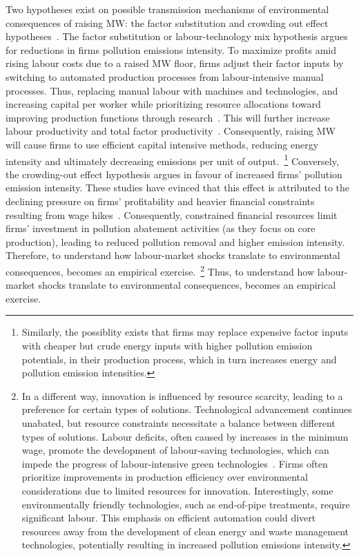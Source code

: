 \documentclass[authoryear, preprint, twocolumn, 1p]{elsarticle}
\begin{document}
    Two hypotheses exist on possible transmission mechanisms of environmental consequences of raising MW: the factor substitution and crowding out effect hypotheses~\citep{zhang2023unintended}. The factor substitution or labour-technology mix hypothesis argues for reductions in firms pollution emissions intensity. To maximize profits amid rising labour costs due to a raised MW floor, firms adjust their factor inputs by switching to automated production processes from labour-intensive manual processes. Thus, replacing manual labour with machines and technologies, and increasing capital per worker while prioritizing resource allocations toward improving production functions through research~\citep{harasztosi2019pays,hau2020firm, geng2022minimum,dai2023minimum, li2020labor}. This will further increase labour productivity and total factor productivity~\citep{riley2017raising}. Consequently, raising MW will cause firms to use efficient capital intensive methods, reducing energy intensity and ultimately decreasing emissions per unit of output.~\footnote{\tiny Similarly, the possiblity exists that firms may replace expensive factor inputs with cheaper but crude energy inputs with higher pollution emission potentials, in their production process, which in turn increases energy and pollution emission intensities.} Conversely, the crowding-out effect hypothesis argues in favour of increased firms' pollution emission intensity. These studies have evinced that this effect is attributed to the declining pressure on firms' profitability and heavier financial constraints resulting from wage hikes~\citep{draca2011minimum, bell2018minimum, du2022minimum}. Consequently, constrained financial resources limit firms' investment in pollution abatement activities (as they focus on core production), leading to reduced pollution removal and higher emission intensity. Therefore, to understand how labour-market shocks translate to environmental consequences, becomes an empirical exercise.~\footnote{\tiny In a different way, innovation is influenced by resource scarcity, leading to a preference for certain types of solutions. Technological advancement continues unabated, but resource constraints necessitate a balance between different types of solutions. Labour deficits, often caused by increases in the minimum wage, promote the development of labour-saving technologies, which can impede the progress of labour-intensive green technologies~\citep{acemoglu2010does}. Firms often prioritize improvements in production efficiency over environmental considerations due to limited resources for innovation. Interestingly, some environmentally friendly technologies, such as end-of-pipe treatments, require significant labour. This emphasis on efficient automation could divert resources away from the development of clean energy and waste management technologies, potentially resulting in increased pollution emissions intensity.} Thus, to understand how labour-market shocks translate to environmental consequences, becomes an empirical exercise.
\end{document}
